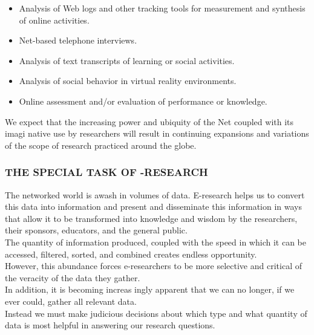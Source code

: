 \documentclass{beamer}
\begin{document}
  \begin{frame}
  \begin{itemize}
\item
Analysis of Web logs and other tracking tools for measurement and synthesis of
online activities.
\item
Net-based telephone interviews.
\item
Analysis of text transcripts of learning or social activities.
\item
Analysis of social behavior in virtual reality environments.
\item
Online assessment and/or evaluation of performance or knowledge.
  \end{itemize}
  We expect that the increasing power and ubiquity of the Net coupled with its imagi
native use by researchers will result in continuing expansions and variations of the scope
of research practiced around the globe.


  \end{frame}

  \begin{frame}
  \frametitle{THE SPECIAL TASK OF -RESEARCH}
  The networked world is awash in volumes of data. E-research helps us to convert
this data into information and present and disseminate this information in ways that
allow it to be transformed into knowledge and wisdom by the researchers, their sponsors,
educators, and the general public. \\
The quantity of information produced, coupled with the speed in which it can be accessed, filtered, sorted, and combined creates endless
opportunity. \\
However, this abundance forces e-researchers to be more selective and critical
of the veracity of the data they gather. \\
In addition, it is becoming increas ingly apparent
that we can no longer, if we ever could, gather all relevant data.\\
 Instead we must make
judicious decisions about which type and what quantity of data is most helpful in answering
our research questions.
  \end{frame}
  
\end{document}

